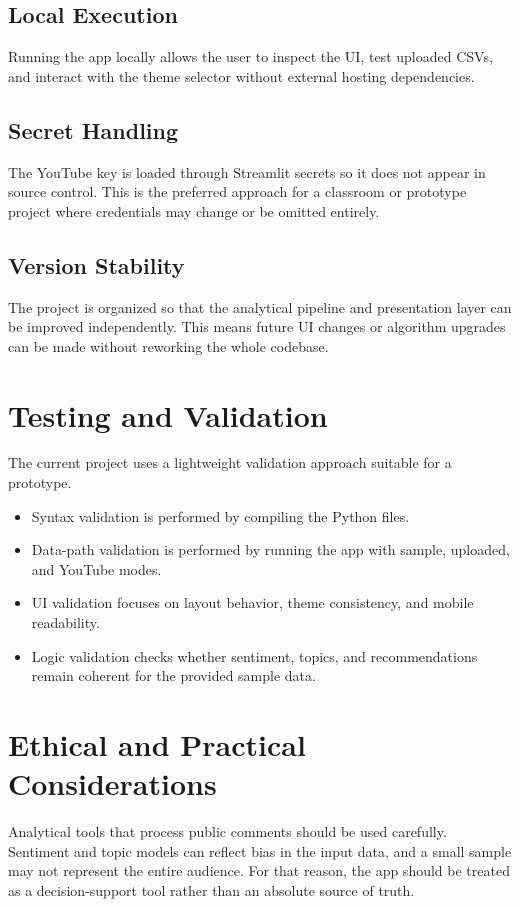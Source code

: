 \subsection{Local Execution}
Running the app locally allows the user to inspect the UI, test uploaded CSVs, and interact with the theme selector without external hosting dependencies.

\subsection{Secret Handling}
The YouTube key is loaded through Streamlit secrets so it does not appear in source control. This is the preferred approach for a classroom or prototype project where credentials may change or be omitted entirely.

\subsection{Version Stability}
The project is organized so that the analytical pipeline and presentation layer can be improved independently. This means future UI changes or algorithm upgrades can be made without reworking the whole codebase.

\section{Testing and Validation}
The current project uses a lightweight validation approach suitable for a prototype.
\begin{itemize}
    \item Syntax validation is performed by compiling the Python files.
    \item Data-path validation is performed by running the app with sample, uploaded, and YouTube modes.
    \item UI validation focuses on layout behavior, theme consistency, and mobile readability.
    \item Logic validation checks whether sentiment, topics, and recommendations remain coherent for the provided sample data.
\end{itemize}

\section{Ethical and Practical Considerations}
Analytical tools that process public comments should be used carefully. Sentiment and topic models can reflect bias in the input data, and a small sample may not represent the entire audience. For that reason, the app should be treated as a decision-support tool rather than an absolute source of truth.

